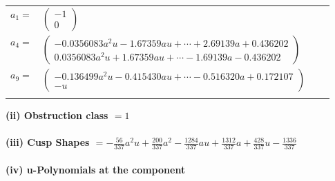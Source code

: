 \documentclass[1p]{elsarticle_modified}
\theoremstyle{definition}
\begin{document}
\begin{tabular}{m{7pt} m{180pt} m{7pt} m{180pt} }
\flushright $a_{1}=$&$\begin{pmatrix}-1\\0\end{pmatrix}$ \\
\flushright $a_{4}=$&$\begin{pmatrix}-0.0356083 a^{2} u-1.67359 a u+\cdots+2.69139 a+0.436202\\0.0356083 a^{2} u+1.67359 a u+\cdots-1.69139 a-0.436202\end{pmatrix}$ \\
\flushright $a_{9}=$&$\begin{pmatrix}-0.136499 a^{2} u-0.415430 a u+\cdots-0.516320 a+0.172107\\- u\end{pmatrix}$\\&\end{tabular}
\flushleft \textbf{(ii) Obstruction class $= 1$}\\~\\
\flushleft \textbf{(iii) Cusp Shapes $= -\frac{56}{337} a^2 u+\frac{200}{337} a^2-\frac{1284}{337} a u+\frac{1312}{337} a+\frac{428}{337} u-\frac{1336}{337}$}\\~\\
\newpage\renewcommand{\arraystretch}{1}
\flushleft \textbf{(iv) u-Polynomials at the component}\newline \\
\end{document}
